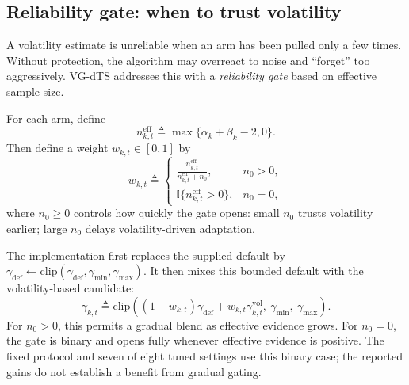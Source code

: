 \subsection{Reliability gate: when to trust volatility}
A volatility estimate is unreliable when an arm has been pulled only a few times. Without protection, the algorithm may overreact to noise and ``forget'' too aggressively.
VG-dTS addresses this with a \emph{reliability gate} based on effective sample size.

For each arm, define
\[
n^{\mathrm{eff}}_{k,t}\triangleq \max\{\alpha_k+\beta_k-2,0\}.
\]
Then define a weight $w_{k,t}\in[0,1]$ by
\begin{equation}
w_{k,t}\triangleq
\begin{cases}
\frac{n^{\mathrm{eff}}_{k,t}}{n^{\mathrm{eff}}_{k,t}+n_0}, & n_0>0,\\
\mathbb{I}\{n^{\mathrm{eff}}_{k,t}>0\}, & n_0=0,
\end{cases}
\label{eq:apx_gate}
\end{equation}
where $n_0\ge 0$ controls how quickly the gate opens:
small $n_0$ trusts volatility earlier; large $n_0$ delays volatility-driven adaptation.

The implementation first replaces the supplied default by $\gamma_{\mathrm{def}}\leftarrow\mathrm{clip}(\gamma_{\mathrm{def}},\gamma_{\min},\gamma_{\max})$. It then mixes this bounded default with the volatility-based candidate:
\begin{equation}
\gamma_{k,t}\triangleq \mathrm{clip}\!\left((1-w_{k,t})\gamma_{\mathrm{def}}+w_{k,t}\gamma^{\mathrm{vol}}_{k,t},\ \gamma_{\min},\ \gamma_{\max}\right).
\label{eq:apx_gamma_mix}
\end{equation}
For $n_0>0$, this permits a gradual blend as effective evidence grows. For $n_0=0$, the gate is binary and opens fully whenever effective evidence is positive. The fixed protocol and seven of eight tuned settings use this binary case; the reported gains do not establish a benefit from gradual gating.

